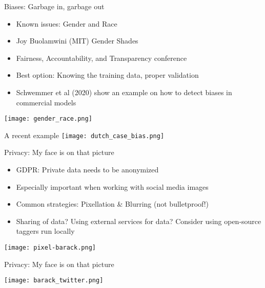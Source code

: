 \begin{frame}{Biases: Garbage in, garbage out}
  
  \begin{itemize}[<+->]
      \setlength\itemsep{0.2cm}
      \item Known issues: Gender and Race
      \item Joy Buolamwini (MIT) \textrightarrow{} Gender Shades
      \item Fairness, Accountability, and Transparency conference
      \item Best option: Knowing the training data, proper validation
      \item Schwemmer et al (2020) show an example on how to detect biases in commercial models
  \end{itemize}
  \vspace*{0.4cm}
  
  \texttt{[image: gender\_race.png]} \centering
  
  \end{frame}
  
  \begin{frame}{A recent example}
  \texttt{[image: dutch\_case\_bias.png]} \centering
  \end{frame}

  \begin{frame}{Privacy: My face is on that picture}
    
    \begin{itemize}[<+->]
        \setlength\itemsep{0.2cm}
        \item GDPR: Private data needs to be anonymized
        \item Especially important when working with social media images
        \item Common strategies: Pixellation \& Blurring (not bulletproof!)
        \item Sharing of data? Using external services for data? \textrightarrow{} Consider using open-source taggers run locally 
    \end{itemize}
    \vspace*{0.25cm}
    
    \texttt{[image: pixel-barack.png]} \centering
    
    \end{frame}

    \begin{frame}{Privacy: My face is on that picture}
      
      \texttt{[image: barack\_twitter.png]} \centering
      
      \end{frame}
  


